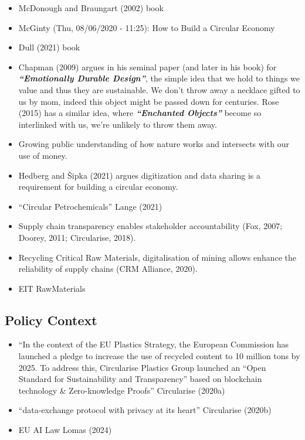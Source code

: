 \documentclass[
  letterpaper,
  DIV=11,
  numbers=noendperiod]{scrartcl}
\begin{document}
\begin{itemize}
\item
  McDonough and Braungart (2002) book
\item
  McGinty (Thu, 08/06/2020 - 11:25): How to Build a Circular Economy
\item
  Dull (2021) book
\item
  Chapman (2009) argues in his seminal paper (and later in his book) for
  \textbf{\emph{``Emotionally Durable Design''}}, the simple idea that
  we hold to things we value and thus they are sustainable. We don't
  throw away a necklace gifted to us by mom, indeed this object might be
  passed down for centuries. Rose (2015) has a similar idea, where
  \textbf{\emph{``Enchanted Objects''}} become so interlinked with us,
  we're unlikely to throw them away.
\item
  Growing public understanding of how nature works and intersects with
  our use of money.
\item
  Hedberg and Šipka (2021) argues digitization and data sharing is a
  requirement for building a circular economy.
\item
  ``Circular Petrochemicals'' Lange (2021)
\item
  Supply chain transparency enables stakeholder accountability (Fox,
  2007; Doorey, 2011; Circularise, 2018).
\item
  Recycling Critical Raw Materials, digitalisation of mining allows
  enhance the reliability of supply chains (CRM Alliance, 2020).
\item
  EIT RawMaterials
\end{itemize}

\subsection{Policy Context}\label{policy-context}

\begin{itemize}
\item
  ``In the context of the EU Plastics Strategy, the European Commission
  has launched a pledge to increase the use of recycled content to 10
  million tons by 2025. To address this, Circularise Plastics Group
  launched an ``Open Standard for Sustainability and Transparency''
  based on blockchain technology \& Zero-knowledge Proofs'' Circularise
  (2020a)
\item
  ``data-exchange protocol with privacy at its heart'' Circularise
  (2020b)
\item
  EU AI Law Lomas (2024)
\end{itemize}
\end{document}
